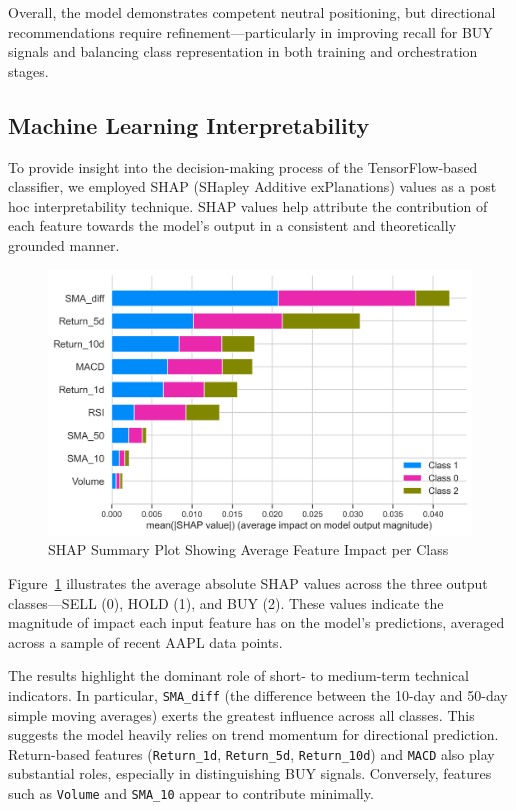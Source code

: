 Overall, the model demonstrates competent neutral positioning, but directional recommendations require refinement—particularly in improving recall for BUY signals and balancing class representation in both training and orchestration stages.

\subsection{Machine Learning Interpretability}

To provide insight into the decision-making process of the TensorFlow-based classifier, we employed SHAP (SHapley Additive exPlanations) values as a post hoc interpretability technique. SHAP values help attribute the contribution of each feature towards the model’s output in a consistent and theoretically grounded manner.

\begin{figure}[h]
  \centering
  \includegraphics[width=0.8\linewidth]{assets/shap_summary_bar.png}
  \caption{SHAP Summary Plot Showing Average Feature Impact per Class}
  \label{fig:shap_summary}
\end{figure}

Figure~\ref{fig:shap_summary} illustrates the average absolute SHAP values across the three output classes—SELL (0), HOLD (1), and BUY (2). These values indicate the magnitude of impact each input feature has on the model's predictions, averaged across a sample of recent AAPL data points.

The results highlight the dominant role of short- to medium-term technical indicators. In particular, \texttt{SMA\_diff} (the difference between the 10-day and 50-day simple moving averages) exerts the greatest influence across all classes. This suggests the model heavily relies on trend momentum for directional prediction. Return-based features (\texttt{Return\_1d}, \texttt{Return\_5d}, \texttt{Return\_10d}) and \texttt{MACD} also play substantial roles, especially in distinguishing BUY signals. Conversely, features such as \texttt{Volume} and \texttt{SMA\_10} appear to contribute minimally.

